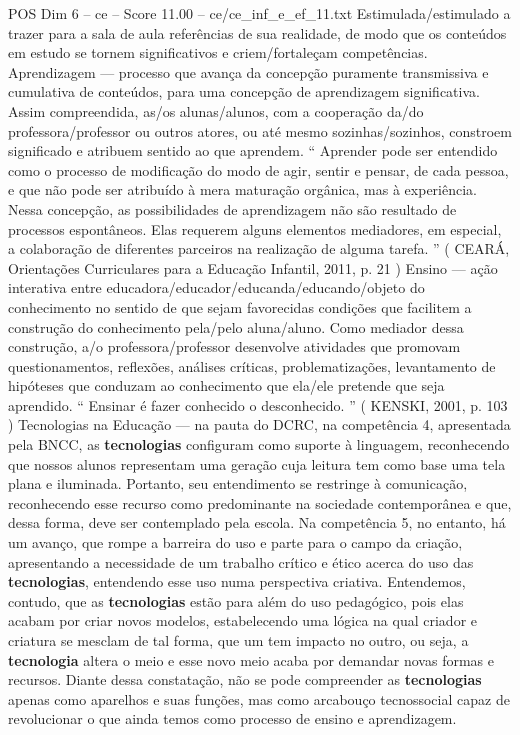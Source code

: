 \begin{textsample}{POS Dim 6 – ce – Score 11.00 – ce/ce\_inf\_e\_ef\_11.txt}
Estimulada/estimulado a trazer para a sala de aula referências de sua realidade, de modo que os conteúdos em estudo se tornem significativos e criem/fortaleçam competências.
Aprendizagem — processo que avança da concepção puramente transmissiva e cumulativa de conteúdos, para uma concepção de aprendizagem significativa.
Assim compreendida, as/os alunas/alunos, com a cooperação da/do professora/professor ou outros atores, ou até mesmo sozinhas/sozinhos, constroem significado e atribuem sentido ao que aprendem. “ Aprender pode ser entendido como o processo de modificação do modo de agir, sentir e pensar, de cada pessoa, e que não pode ser atribuído à mera maturação orgânica, mas à experiência.
Nessa concepção, as possibilidades de aprendizagem não são resultado de processos espontâneos.
Elas requerem alguns elementos mediadores, em especial, a colaboração de diferentes parceiros na realização de alguma tarefa. ” ( CEARÁ, Orientações Curriculares para a Educação Infantil, 2011, p. 21 ) Ensino — ação interativa entre educadora/educador/educanda/educando/objeto do conhecimento no sentido de que sejam favorecidas condições que facilitem a construção do conhecimento pela/pelo aluna/aluno.
Como mediador dessa construção, a/o professora/professor desenvolve atividades que promovam questionamentos, reflexões, análises críticas, problematizações, levantamento de hipóteses que conduzam ao conhecimento que ela/ele pretende que seja aprendido. “ Ensinar é fazer conhecido o desconhecido. ” ( KENSKI, 2001, p. 103 ) Tecnologias na Educação — na pauta do DCRC, na competência 4, apresentada pela BNCC, as \textbf{tecnologias} configuram como suporte à linguagem, reconhecendo que nossos alunos representam uma geração cuja leitura tem como base uma tela plana e iluminada.
Portanto, seu entendimento se restringe à comunicação, reconhecendo esse recurso como predominante na sociedade contemporânea e que, dessa forma, deve ser contemplado pela escola.
Na competência 5, no entanto, há um avanço, que rompe a barreira do uso e parte para o campo da criação, apresentando a necessidade de um trabalho crítico e ético acerca do uso das \textbf{tecnologias}, entendendo esse uso numa perspectiva criativa.
Entendemos, contudo, que as \textbf{tecnologias} estão para além do uso pedagógico, pois elas acabam por criar novos modelos, estabelecendo uma lógica na qual criador e criatura se mesclam de tal forma, que um tem impacto no outro, ou seja, a \textbf{tecnologia} altera o meio e esse novo meio acaba por demandar novas formas e recursos.
Diante dessa constatação, não se pode compreender as \textbf{tecnologias} apenas como aparelhos e suas funções, mas como arcabouço tecnossocial capaz de revolucionar o que ainda temos como processo de ensino e aprendizagem.

\end{textsample}
